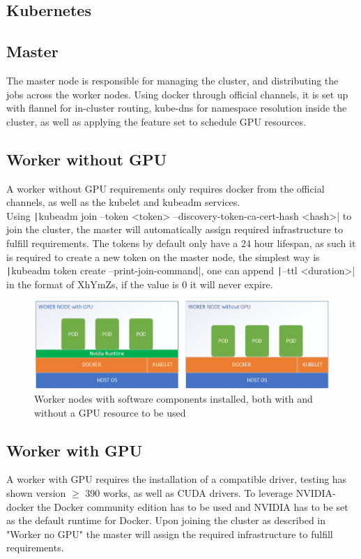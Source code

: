 \documentclass[../main.tex]{subfiles}
\begin{document}
\subsection{Kubernetes}
\subsection*{Master}
The master node is responsible for managing the cluster, and distributing the jobs across the worker nodes. Using docker through official channels, it is set up with flannel for in-cluster routing, kube-dns for namespace resolution inside the cluster, as well as applying the feature set to schedule GPU resources.


\subsection*{Worker without GPU}
A worker without GPU requirements only requires docker from the official channels, as well as the kubelet and kubeadm services.\\
Using \texttt|kubeadm join --token <token> --discovery-token-ca-cert-hash <hash>| to join the cluster, the master will automatically assign required infrastructure to fulfill requirements. The tokens by default only have a 24 hour lifespan, as such it is required to create a new token on the master node, the simplest way is \\
\texttt|kubeadm token create --print-join-command|, one can append \texttt|--ttl <duration>| in the format of XhYmZs, if the value is 0 it will never expire. \cite{kubeadm_token}
\begin{figure}[H]
    \centering
    \includegraphics{img/Kubernetes_individual_nodes.png}
    \caption{Worker nodes with software components installed, both with and without a GPU resource to be used}
    \label{fig:kubernetes_individual_nodes}
\end{figure}

\subsection*{Worker with GPU}
A worker with GPU requires the installation of a compatible driver, testing has shown version $\geq$ 390 works, as well as CUDA drivers. To leverage NVIDIA-docker the Docker community edition has to be used and NVIDIA has to be set as the default runtime for Docker. Upon joining the cluster as described in "Worker no GPU" the master will assign the required infrastructure to fulfill requirements.
\end{document}
